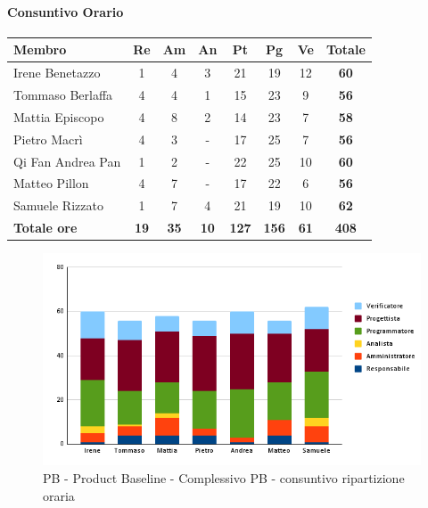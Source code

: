 \paragraph{Consuntivo Orario}
\begin{center}
	\renewcommand{\arraystretch}{1.8} %
	\begin{tabular}{ |m{8em}|c|c|c|c|c|c|c| }
	\hline
	\textbf{Membro} & \textbf{Re} & \textbf{Am} &  \textbf{An} &  \textbf{Pt} &  \textbf{Pg} &  \textbf{Ve} &  \textbf{Totale}\\
    \hline
    Irene Benetazzo   & 1 & 4  & 3 & 21 & 19 & 12 & \textbf{60} \\
    \hline
    Tommaso Berlaffa  & 4 & 4  & 1 & 15 & 23 & 9 & \textbf{56} \\
    \hline
    Mattia Episcopo   & 4 & 8 & 2 & 14 & 23 & 7 & \textbf{58} \\
    \hline
    Pietro Macrì      & 4 & 3  & - & 17 & 25 & 7 & \textbf{56} \\
    \hline
    Qi Fan Andrea Pan & 1 & 2 & - & 22 & 25 & 10 & \textbf{60} \\
    \hline
    Matteo Pillon     & 4 &7  & - & 17 & 22 & 6 & \textbf{56} \\
    \hline
    Samuele Rizzato   & 1 &7  &4 & 21 & 19 & 10 & \textbf{62} \\
    \hline
    \textbf{Totale ore} & \textbf{19} & \textbf{35} & \textbf{10} & \textbf{127} & \textbf{156} & \textbf{61} & \textbf{408} \\
    \hline
	\end{tabular}
\end{center}
\begin{figure}[H]
    \centering\includegraphics[width=\textwidth, height=\textheight,keepaspectratio]{images/consuntivo/consuntivo-PB-ore-totale.png}
    \caption{PB - Product Baseline - Complessivo PB - consuntivo ripartizione oraria}
\end{figure}
\newpage


